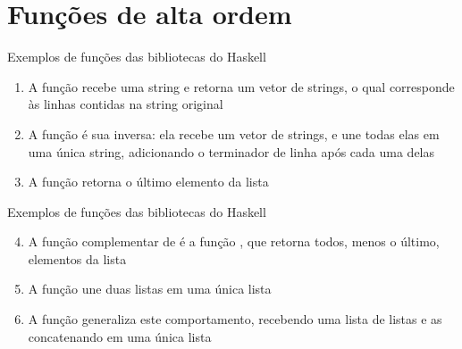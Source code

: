 \section{Funções de alta ordem}

\begin{frame}[fragile]{Exemplos de funções das bibliotecas do Haskell}

    \begin{enumerate}
        \item A função  recebe uma string e retorna um vetor de strings,
            o qual corresponde às linhas contidas na string original
        \item A função  é sua inversa: ela recebe um vetor de strings,
            e une todas elas em uma única string, adicionando o terminador de linha
            após cada uma delas

        \item A função  retorna o último elemento da lista

    \end{enumerate}

\end{frame}

\begin{frame}[fragile]{Exemplos de funções das bibliotecas do Haskell}

    \begin{enumerate}
        \setcounter{enumi}{3}
        \item A função complementar de  é a função ,
            que retorna todos, menos o último, elementos da lista


        \item A função  une duas listas em uma única lista


        \item A função  generaliza este comportamento, recebendo uma lista
            de listas e as concatenando em uma única lista

    \end{enumerate}

\end{frame}

